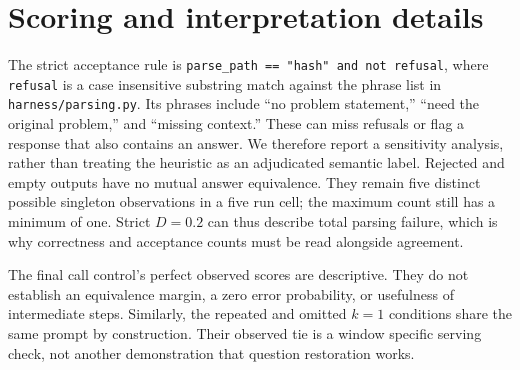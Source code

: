 \documentclass{article}
\begin{document}
\section{Scoring and interpretation details}
\label{app:scoring}
The strict acceptance rule is \texttt{parse\_path == "hash" and not refusal}, where \texttt{refusal} is a case insensitive substring match against the phrase list in \texttt{harness/parsing.py}. Its phrases include ``no problem statement,'' ``need the original problem,'' and ``missing context.'' These can miss refusals or flag a response that also contains an answer. We therefore report a sensitivity analysis, rather than treating the heuristic as an adjudicated semantic label. Rejected and empty outputs have no mutual answer equivalence. They remain five distinct possible singleton observations in a five run cell; the maximum count still has a minimum of one. Strict $D=0.2$ can thus describe total parsing failure, which is why correctness and acceptance counts must be read alongside agreement.

The final call control's perfect observed scores are descriptive. They do not establish an equivalence margin, a zero error probability, or usefulness of intermediate steps. Similarly, the repeated and omitted $k=1$ conditions share the same prompt by construction. Their observed tie is a window specific serving check, not another demonstration that question restoration works.
\end{document}
